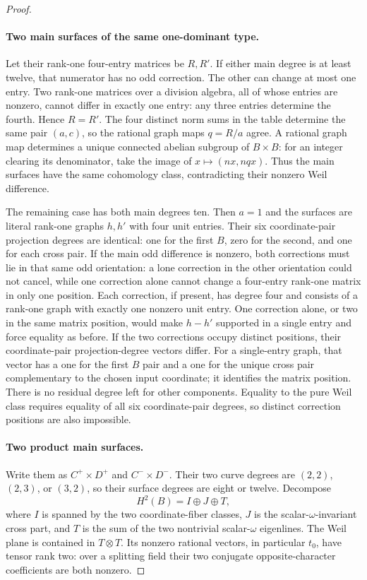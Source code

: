 \begin{proof}
\paragraph{Two main surfaces of the same one-dominant type.}
Let their rank-one four-entry matrices be $R,R'$. If either main degree
is at least twelve, that numerator has no odd correction. The other
can change at most one entry. Two rank-one matrices over a division
algebra, all of whose entries are nonzero, cannot differ in exactly
one entry: any three entries determine the fourth. Hence $R=R'$.
The four distinct norm sums in the table determine the same pair
$(a,c)$, so the rational graph maps $q=R/a$ agree. A rational graph
map determines a unique connected abelian subgroup of $B\times B$:
for an integer clearing its denominator, take the image of
$x\mapsto(nx,nqx)$. Thus the main surfaces have the same cohomology
class, contradicting their nonzero Weil difference.

The remaining case has both main degrees ten. Then $a=1$ and the
surfaces are literal rank-one graphs $h,h'$ with four unit entries.
Their six coordinate-pair projection degrees are identical: one for
the first $B$, zero for the second, and one for each cross pair.
If the main odd difference is nonzero, both corrections must lie in
that same odd orientation: a lone correction in the other orientation
could not cancel, while one correction alone cannot change a four-entry
rank-one matrix in only one position.
Each correction, if present, has degree four and consists of a
rank-one graph with exactly one nonzero unit entry. One correction
alone, or two in the same matrix position, would make $h-h'$ supported
in a single entry and force equality as before. If the two corrections
occupy distinct positions, their coordinate-pair projection-degree
vectors differ. For a single-entry graph, that vector has a one for
the first $B$ pair and a one for the unique cross pair complementary
to the chosen input coordinate; it identifies the matrix position.
There is no residual degree left for other components. Equality to
the pure Weil class requires equality of all six coordinate-pair
degrees, so distinct correction positions are also impossible.

\paragraph{Two product main surfaces.}
Write them as $C^+\times D^+$ and $C^-\times D^-$. Their two curve
degrees are $(2,2)$, $(2,3)$, or $(3,2)$, so their surface degrees are
eight or twelve. Decompose
\[
 H^2(B)=I\oplus J\oplus T,
\]
where $I$ is spanned by the two coordinate-fiber classes, $J$ is the
scalar-$\omega$-invariant cross part, and $T$ is the sum of the two
nontrivial scalar-$\omega$ eigenlines. The Weil plane is contained in
$T\otimes T$. Its nonzero rational vectors, in particular $t_0$,
have tensor rank two: over a splitting field their two conjugate
opposite-character coefficients are both nonzero.


\end{proof}
